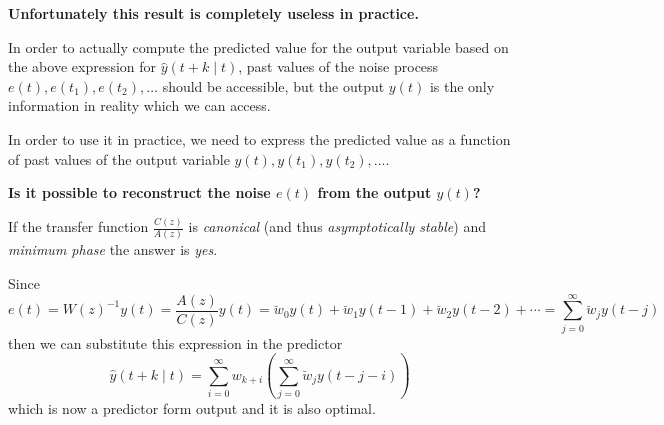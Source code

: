 \textbf{Unfortunately this result is completely useless in practice.}

In order to actually compute the predicted value for the output variable based on the above expression for $\hat{y}(t+k \mid t)$, past values of the noise process $e(t),e(t_1),e(t_2),\ldots$ should be accessible, but the output $y(t)$ is the only information in reality which we can access.

In order to use it in practice, we need to express the predicted value as a function of past values of the output variable $y(t), y(t_1), y(t_2),\ldots$.

\textbf{Is it possible to reconstruct the noise $e(t)$ from the output $y(t)$?}

If the transfer function $\frac{C(z)}{A(z)}$ is \emph{canonical} (and thus \emph{asymptotically stable}) and \emph{minimum phase} the answer is \emph{yes}.

Since
\begin{equation}\label{eq:reconstruction-noise-from-data}
	e(t)=W(z)^{-1} y(t)=\frac{A(z)}{C(z)} y(t)=\breve{w}_{0} y(t)+\breve{w}_{1} y(t-1)+\breve{w}_{2} y(t-2)+\cdots = \sum_{j=0}^{\infty} \breve{w}_{j}y(t-j)
\end{equation}
then we can substitute this expression in the predictor
\[
	\boxed{\hat{y}(t+k \mid t)=\sum_{i=0}^{\infty} w_{k+i}\left(\sum_{j=0}^{\infty} \breve{w}_{j}y(t-j-i)\right)}
\]
which is now a predictor form output and it is also optimal.

